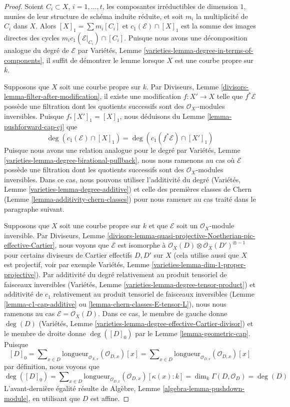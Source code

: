 \begin{proof}
Soient $C_i \subset X$, $i = 1, \ldots, t$, les composantes irréductibles
de dimension $1$, munies de leur structure de schéma induite réduite, et soit $m_i$ la
multiplicité de $C_i$ dans $X$. Alors $[X]_1 = \sum m_i[C_i]$ et
$c_1(\mathcal{E}) \cap [X]_1$ est la somme des images directes des cycles
$m_i c_1(\mathcal{E}|_{C_i}) \cap [C_i]$. Puisque nous avons une décomposition analogue
du degré de $\mathcal{E}$ par
Variétés, Lemme \ref{varieties-lemma-degree-in-terms-of-components},
il suffit de démontrer le lemme lorsque $X$ est une courbe propre sur $k$.

\medskip\noindent
Supposons que $X$ soit une courbe propre sur $k$.
Par Diviseurs, Lemme \ref{divisors-lemma-filter-after-modification},
il existe une modification $f : X' \to X$ telle que $f^*\mathcal{E}$
possède une filtration dont les quotients successifs sont des
$\mathcal{O}_{X'}$-modules inversibles. Puisque $f_*[X']_1 = [X]_1$, nous déduisons
du Lemme \ref{lemma-pushforward-cap-cj} que
$$
\deg(c_1(\mathcal{E}) \cap [X]_1) = \deg(c_1(f^*\mathcal{E}) \cap [X']_1)
$$
Puisque nous avons une relation analogue pour le degré par
Variétés, Lemme \ref{varieties-lemma-degree-birational-pullback},
nous nous ramenons au cas où $\mathcal{E}$ possède une filtration dont les
quotients successifs sont des $\mathcal{O}_X$-modules inversibles.
Dans ce cas, nous pouvons utiliser l'additivité du degré
(Variétés, Lemme \ref{varieties-lemma-degree-additive})
et celle des premières classes de Chern (Lemme \ref{lemma-additivity-chern-classes})
pour nous ramener au cas traité dans le paragraphe suivant.

\medskip\noindent
Supposons que $X$ soit une courbe propre sur $k$ et que $\mathcal{E}$ soit un
$\mathcal{O}_X$-module inversible. Par
Diviseurs, Lemme
\ref{divisors-lemma-quasi-projective-Noetherian-pic-effective-Cartier},
nous voyons que $\mathcal{E}$ est isomorphe à
$\mathcal{O}_X(D) \otimes \mathcal{O}_X(D')^{\otimes -1}$
pour certains diviseurs de Cartier effectifs $D, D'$ sur $X$ (cela utilise aussi
que $X$ est projectif, voir par exemple
Variétés, Lemme \ref{varieties-lemma-dim-1-proper-projective}).
Par additivité du degré relativement au produit tensoriel de faisceaux inversibles
(Variétés, Lemme \ref{varieties-lemma-degree-tensor-product})
et additivité de $c_1$ relativement au produit tensoriel de faisceaux inversibles
(Lemme \ref{lemma-c1-cap-additive} ou \ref{lemma-chern-classes-E-tensor-L}),
nous nous ramenons au cas $\mathcal{E} = \mathcal{O}_X(D)$.
Dans ce cas, le membre de gauche donne $\deg(D)$
(Variétés, Lemme \ref{varieties-lemma-degree-effective-Cartier-divisor})
et le membre de droite donne $\deg([D]_0)$ par le
Lemme \ref{lemma-geometric-cap}.
Puisque
$$
[D]_0 = \sum\nolimits_{x \in D}
\text{longueur}_{\mathcal{O}_{X, x}}(\mathcal{O}_{D, x}) [x] =
\sum\nolimits_{x \in D}
\text{longueur}_{\mathcal{O}_{D, x}}(\mathcal{O}_{D, x}) [x]
$$
par définition, nous voyons que
$$
\deg([D]_0) = \sum\nolimits_{x \in D}
\text{longueur}_{\mathcal{O}_{D, x}}(\mathcal{O}_{D, x}) [\kappa(x) : k] =
\dim_k \Gamma(D, \mathcal{O}_D) = \deg(D)
$$
L'avant-dernière égalité résulte de
Algèbre, Lemme \ref{algebra-lemma-pushdown-module},
en utilisant que $D$ est affine.
\end{proof}

